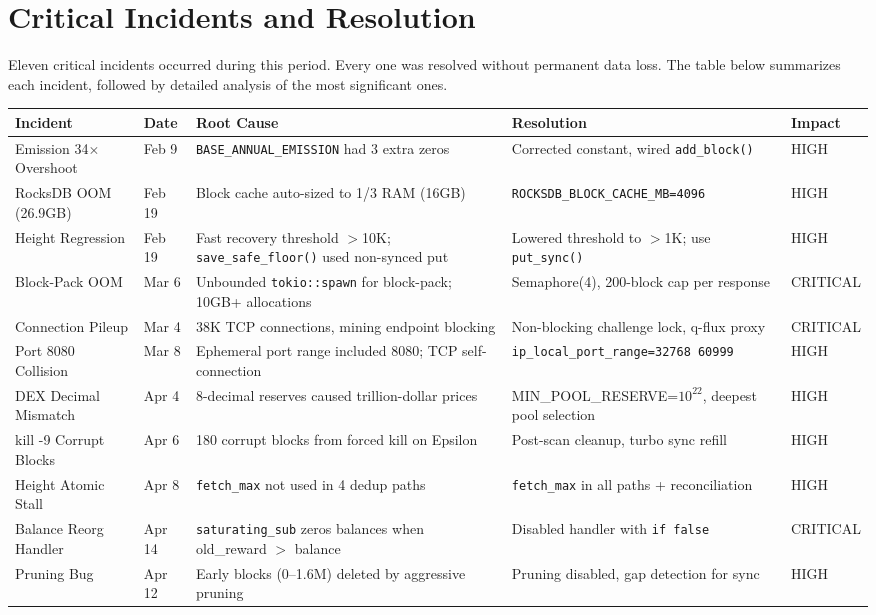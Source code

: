 \documentclass[12pt,a4paper]{article}
\begin{document}
\section{Critical Incidents and Resolution}

Eleven critical incidents occurred during this period. Every one was resolved without permanent data loss. The table below summarizes each incident, followed by detailed analysis of the most significant ones.

\begin{center}
\small
\begin{longtable}{@{}p{2.8cm}lp{3.5cm}p{3.5cm}l@{}}
\toprule
\textbf{Incident} & \textbf{Date} & \textbf{Root Cause} & \textbf{Resolution} & \textbf{Impact} \\
\midrule
\endhead
Emission 34$\times$ Overshoot & Feb 9 & \texttt{BASE\_ANNUAL\_EMISSION} had 3 extra zeros & Corrected constant, wired \texttt{add\_block()} & HIGH \\
\midrule
RocksDB OOM (26.9GB) & Feb 19 & Block cache auto-sized to 1/3 RAM (16GB) & \texttt{ROCKSDB\_BLOCK\_CACHE\_MB=4096} & HIGH \\
\midrule
Height Regression & Feb 19 & Fast recovery threshold $>$10K; \texttt{save\_safe\_floor()} used non-synced put & Lowered threshold to $>$1K; use \texttt{put\_sync()} & HIGH \\
\midrule
Block-Pack OOM & Mar 6 & Unbounded \texttt{tokio::spawn} for block-pack; 10GB+ allocations & Semaphore(4), 200-block cap per response & CRITICAL \\
\midrule
Connection Pileup & Mar 4 & 38K TCP connections, mining endpoint blocking & Non-blocking challenge lock, q-flux proxy & CRITICAL \\
\midrule
Port 8080 Collision & Mar 8 & Ephemeral port range included 8080; TCP self-connection & \texttt{ip\_local\_port\_range=32768 60999} & HIGH \\
\midrule
DEX Decimal Mismatch & Apr 4 & 8-decimal reserves caused trillion-dollar prices & MIN\_POOL\_RESERVE=$10^{22}$, deepest pool selection & HIGH \\
\midrule
kill -9 Corrupt Blocks & Apr 6 & 180 corrupt blocks from forced kill on Epsilon & Post-scan cleanup, turbo sync refill & HIGH \\
\midrule
Height Atomic Stall & Apr 8 & \texttt{fetch\_max} not used in 4 dedup paths & \texttt{fetch\_max} in all paths + reconciliation & HIGH \\
\midrule
Balance Reorg Handler & Apr 14 & \texttt{saturating\_sub} zeros balances when old\_reward $>$ balance & Disabled handler with \texttt{if false} & CRITICAL \\
\midrule
Pruning Bug & Apr 12 & Early blocks (0--1.6M) deleted by aggressive pruning & Pruning disabled, gap detection for sync & HIGH \\
\bottomrule
\end{longtable}
\end{center}
\end{document}
